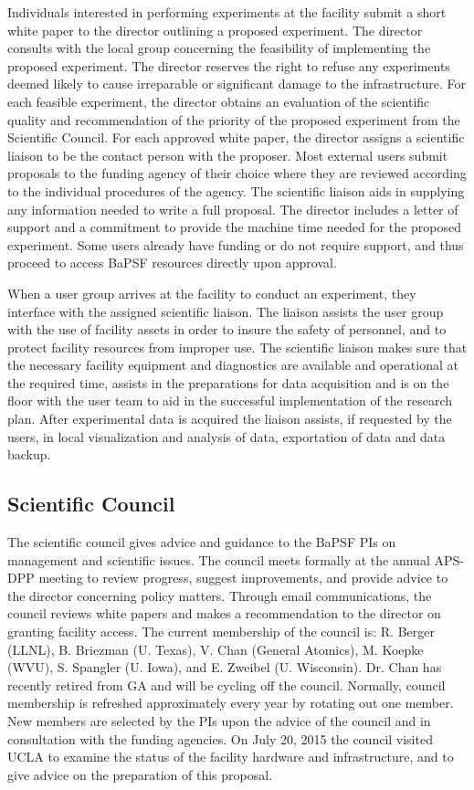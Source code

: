 \documentclass[11pt]{article}
\begin{document}
Individuals interested in performing experiments at the facility
submit a short white paper to the director outlining a proposed
experiment. The director consults with the local group concerning the
feasibility of implementing the proposed experiment. The director
reserves the right to refuse any experiments deemed likely to cause
irreparable or significant damage to the infrastructure. For each
feasible experiment, the director obtains an evaluation of the
scientific quality and recommendation of the priority of the proposed
experiment from the Scientific Council. For each approved white paper,
the director assigns a scientific liaison to be the contact person
with the proposer. Most external users submit proposals to the funding
agency of their choice where they are reviewed according to the
individual procedures of the agency. The scientific liaison aids in
supplying any information needed to write a full proposal. The
director includes a letter of support and a commitment to provide the
machine time needed for the proposed experiment. Some users already
have funding or do not require support, and thus proceed to access
BaPSF resources directly upon approval.

When a user group arrives at the facility to conduct an experiment, they
interface with the assigned scientific liaison. The liaison assists the
user group with the use of facility assets in order to insure the safety
of personnel, and to protect facility resources from improper use. The
scientific liaison makes sure that the necessary facility equipment and
diagnostics are available and operational at the required time, assists
in the preparations for data acquisition and is on the floor with the
user team to aid in the successful implementation of the research plan.
After experimental data is acquired the liaison assists, if requested by
the users, in local visualization and analysis of data, exportation of
data and data backup.

\subsection{Scientific Council}

The scientific council gives advice and guidance to the BaPSF PIs on
management and scientific issues. The council meets formally at the
annual APS-DPP meeting to review progress, suggest improvements, and
provide advice to the director concerning policy matters. Through email
communications, the council reviews white papers and makes a
recommendation to the director on granting facility access. The current
membership of the council is: R. Berger (LLNL), B. Briezman (U. Texas),
V. Chan (General Atomics), M. Koepke (WVU), S. Spangler (U. Iowa), and
E. Zweibel (U. Wisconsin). Dr. Chan has recently retired from GA and
will be cycling off the council. Normally, council membership is
refreshed approximately every year by rotating out one member. New
members are selected by the PIs upon the advice of the council and in
consultation with the funding agencies. On July 20, 2015 the council
visited UCLA to examine the status of the facility hardware and
infrastructure, and to give advice on the preparation of this proposal.
\end{document}
